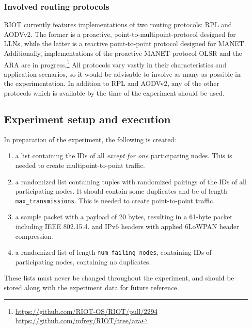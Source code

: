 \documentclass{acm_proc_article-sp}
\begin{document}
\subsubsection{Involved routing protocols}
\label{subsec:protocols}
RIOT currently features implementations of two routing protocols: RPL\cite{RFC-6550} and AODVv2\cite{draft-ietf-manet-aodvv2-09}. The former is a proactive, point-to-multipoint-protocol designed for \glspl{LLN}, while the latter is a reactive point-to-point protocol designed for \gls{MANET}. Additionally, implementations of the proactive \gls{MANET} protocol OLSR\cite{RFC-3626} and the \gls{ARA}\cite{ara} are in progress.\footnote{ \url{https://github.com/RIOT-OS/RIOT/pull/2294}\\  \url{https://github.com/mfrey/RIOT/tree/ara}}
All protocols vary vastly in their characteristics and application scenarios, so it would be advisable to involve as many as possible in the experimentation. In addition to RPL and AODVv2, any of the other protocols which is available by the time of the experiment should be used.

\subsection{Experiment setup and execution}
\label{subsec:setup}

In preparation of the experiment, the following is created:
\begin{enumerate}
\item a list containing the IDs of all \emph{except for one} participating nodes. This is needed to create multipoint-to-point traffic.
\item a randomized list containing tuples with randomized pairings of the IDs of all participating nodes. It should contain some duplicates and be of length \texttt{max\_transmissions}. This is needed to create point-to-point traffic.
\item a sample packet with a payload of 20 bytes, resulting in a 61-byte packet including IEEE 802.15.4. and IPv6 headers with applied 6LoWPAN header compression.
\item a randomized list of length \texttt{num\_failing\_nodes}, containing IDs of participating nodes, containing no duplicates.
\end{enumerate}
These lists must never be changed throughout the experiment, and should be stored along with the experiment data for future reference.\\
\end{document}
